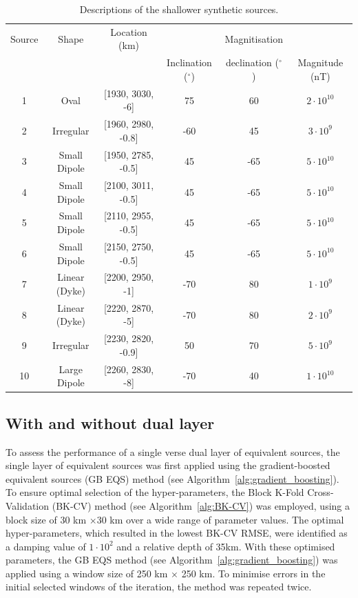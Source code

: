 \begin{table}[hbt!]
\centering
\begin{tabular}{c c c c c c}
\hline
Source & Shape & Location (km) &  & Magnitisation & \\
\cline{4-6}
 &  &  & Inclination ($^\circ$) & declination ($^\circ$) & Magnitude (nT) \\
\hline
1 & Oval & [1930, 3030, -6] & 75 & 60 & $2 \cdot 10^{10}$ \\
2 & Irregular & [1960, 2980, -0.8] & -60 & 45 & $3 \cdot 10^{9}$ \\
3 & Small Dipole & [1950, 2785, -0.5] & 45 & -65 & $5 \cdot 10^{10}$ \\
4 & Small Dipole	& [2100, 3011, -0.5] & 45 & -65 & $5 \cdot 10^{10}$ \\
5 & Small Dipole & [2110, 2955, -0.5] & 45 & -65 & $5 \cdot 10^{10}$ \\
6 & Small Dipole & [2150, 2750, -0.5] & 45 & -65 & $5 \cdot 10^{10}$ \\
7 &	Linear (Dyke) & [2200, 2950, -1] & -70 & 80 & $1 \cdot 10^{9}$ \\
8 & Linear (Dyke) & [2220, 2870, -5] & -70 & 80 & $2 \cdot 10^{9}$ \\
9 & Irregular & [2230, 2820, -0.9] & 50 & 70 & $5 \cdot 10^{9}$ \\
10 & Large Dipole & [2260, 2830, -8] & -70 & 40 & $1 \cdot 10^{10}$ \\
\hline
\end{tabular}
\caption{Descriptions of the shallower synthetic sources.}
\label{table:shallow_sources}
\end{table}

\subsection{With and without dual layer}
To assess the performance of a single verse dual layer of equivalent sources, the single layer of equivalent sources was first applied using the gradient-boosted equivalent sources (GB EQS) method (see Algorithm~\ref{alg:gradient_boosting}). To ensure optimal selection of the hyper-parameters, the Block K-Fold Cross-Validation (BK-CV) method (see Algorithm~\ref{alg:BK-CV}) was employed, using a block size of 30 km $\times$30 km over a wide range of parameter values. The optimal hyper-parameters, which resulted in the lowest BK-CV RMSE, were identified as a damping value of $1 \cdot 10^{2}$ and a relative depth of 35km. With these optimised parameters, the GB EQS method (see Algorithm~\ref{alg:gradient_boosting}) was applied using a window size of 250 km $\times$ 250 km. To minimise errors in the initial selected windows of the iteration, the method was repeated twice. 


